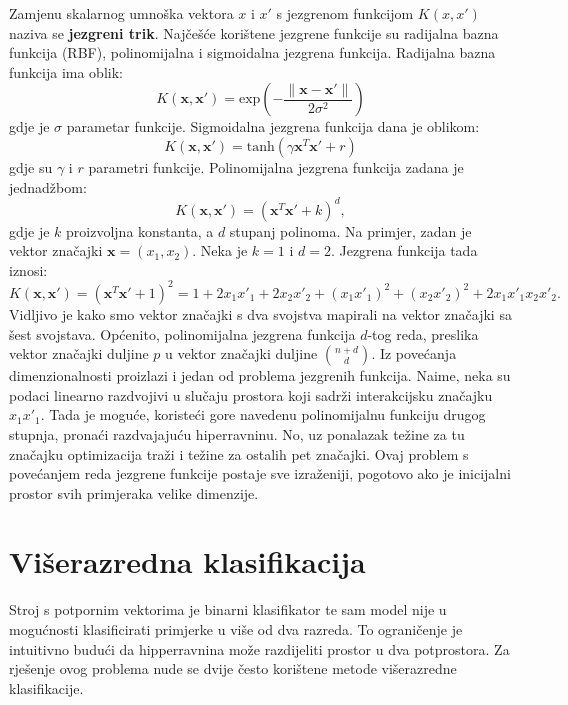 \documentclass[times, utf8, zavrsni, numeric]{fer}
\begin{document}
Zamjenu skalarnog umnoška vektora $x$ i $x'$ s jezgrenom funkcijom $K(x, x')$ naziva se
\textbf{jezgreni trik}. 
Najčešće korištene jezgrene funkcije su radijalna bazna funkcija (RBF), polinomijalna i 
sigmoidalna jezgrena funkcija. 
Radijalna bazna funkcija ima oblik:
\begin{equation*}
  K(\mathbf{x}, \mathbf{x}') = \text{exp}(- \frac{\|\mathbf{x} - \mathbf{x}'\|}{2\sigma^2})
\end{equation*}
gdje je $\sigma$ parametar funkcije. Sigmoidalna jezgrena funkcija dana je oblikom:
\begin{equation*}
  K(\mathbf{x}, \mathbf{x}') = \text{tanh}(\gamma\mathbf{x}^T\mathbf{x}' + r)
\end{equation*}
gdje su $\gamma$ i $r$ parametri funkcije.
Polinomijalna jezgrena funkcija zadana je jednadžbom:
\begin{equation*}
  K(\mathbf{x}, \mathbf{x}') = (\mathbf{x}^T\mathbf{x}' + k)^d,
\end{equation*}
gdje je $k$ proizvoljna konstanta, a $d$ stupanj polinoma.
Na primjer, zadan je vektor značajki $\mathbf{x} = (x_1, x_2)$. 
Neka je $k=1$ i $d=2$. Jezgrena funkcija tada iznosi:
\begin{equation*}
  K(\mathbf{x}, \mathbf{x}') = (\mathbf{x}^T\mathbf{x}' + 1)^2 =
  1 + 2x_1x'_1 + 2x_2x'_2 + (x_1x'_1)^2 + (x_2x'_2)^2 + 2x_1x'_1x_2x'_2.
\end{equation*}
Vidljivo je kako smo vektor značajki s dva svojstva mapirali na vektor značajki sa šest svojstava.
Općenito, polinomijalna jezgrena funkcija $d$-tog reda, preslika vektor značajki duljine $p$ u 
vektor značajki duljine $\binom{n + d}{d}$.
Iz povećanja dimenzionalnosti proizlazi i jedan od problema jezgrenih funkcija.
Naime, neka su podaci linearno razdvojivi u slučaju prostora koji sadrži interakcijsku značajku
$x_1x'_1$. Tada je moguće, koristeći gore navedenu polinomijalnu funkciju drugog stupnja, pronaći
razdvajajuću hiperravninu. No, uz ponalazak težine za tu značajku optimizacija traži i težine za ostalih 
pet značajki. Ovaj problem s povećanjem reda jezgrene funkcije postaje sve izraženiji, pogotovo ako je
inicijalni prostor svih primjeraka velike dimenzije.

\section{Višerazredna klasifikacija}
Stroj s potpornim vektorima je binarni klasifikator te sam model nije u mogućnosti klasificirati
primjerke u više od dva razreda.
To ograničenje je intuitivno budući da hipperravnina može razdijeliti prostor u dva potprostora.
Za rješenje ovog problema nude se dvije često korištene metode višerazredne klasifikacije.
\end{document}
